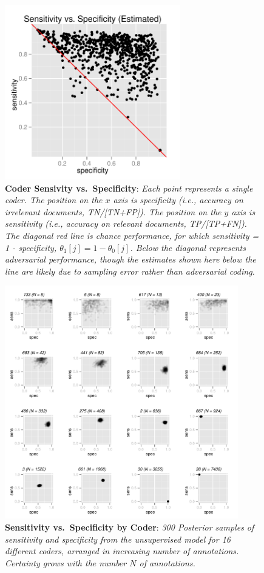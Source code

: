 \documentclass{article}
\begin{document}
\begin{figure}
\begin{center}
\includegraphics[height=3.0in]{img/sens_vs_spec_hat.pdf}
\parbox{5in}{\caption{\small {\bf Coder Sensivity vs.\ Specificity}: {\it Each point
represents a single coder.  The position on the $x$ axis is
specificity (i.e., accuracy on irrelevant documents, TN/[TN+FP]).  The position
on the $y$ axis is sensitivity (i.e., accuracy on relevant documents, 
TP/[TP+FN]).  The diagonal red line is chance performance, for
which sensitivity = 1 - specificity, $\theta_1[j] =
1 - \theta_0[j]$. Below the diagonal represents adversarial
performance, though the estimates shown here below the line are
likely due to sampling error rather than adversarial coding.}}%
\label{sens_spec.fig}}
\end{center}
\end{figure}
%
\begin{figure}
\begin{center}
\includegraphics[height=4.0in]{img/posterior_sens_spec.pdf}
\parbox{5in}{\caption{\small {\bf Sensitivity vs.\ Specificity by Coder}: {\it  
300 Posterior samples of sensitivity and specificity from the
unsupervised model for 16  
different coders, arranged in increasing number of annotations.   
Certainty grows with the number $N$ of annotations. 
}}\label{post_sens_spec_by_anno.fig}}
\end{center}
\end{figure}
\end{document}
